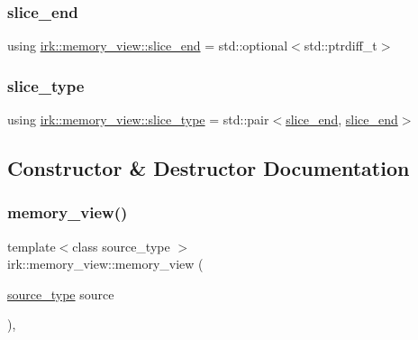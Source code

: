 \mbox{\label{classirk_1_1memory__view_afbb67d0d922dfae3ea53d41706bd8eea}} 
\subsubsection{\texorpdfstring{slice\+\_\+end}{slice\_end}}
{\footnotesize\ttfamily using \mbox{\hyperlink{classirk_1_1memory__view_afbb67d0d922dfae3ea53d41706bd8eea}{irk\+::memory\+\_\+view\+::slice\+\_\+end}} =  std\+::optional$<$std\+::ptrdiff\+\_\+t$>$}

\mbox{\label{classirk_1_1memory__view_ac0c1d9600bf81e8cb861a89ab104a43c}} 
\subsubsection{\texorpdfstring{slice\+\_\+type}{slice\_type}}
{\footnotesize\ttfamily using \mbox{\hyperlink{classirk_1_1memory__view_ac0c1d9600bf81e8cb861a89ab104a43c}{irk\+::memory\+\_\+view\+::slice\+\_\+type}} =  std\+::pair$<$\mbox{\hyperlink{classirk_1_1memory__view_afbb67d0d922dfae3ea53d41706bd8eea}{slice\+\_\+end}}, \mbox{\hyperlink{classirk_1_1memory__view_afbb67d0d922dfae3ea53d41706bd8eea}{slice\+\_\+end}}$>$}



\subsection{Constructor \& Destructor Documentation}
\mbox{\label{classirk_1_1memory__view_a25918933f1b7944199c65654517d2a72}} 
\subsubsection{\texorpdfstring{memory\+\_\+view()}{memory\_view()}\hspace{0.1cm}{\footnotesize\ttfamily [1/4]}}
{\footnotesize\ttfamily template$<$class source\+\_\+type $>$ \\
irk\+::memory\+\_\+view\+::memory\+\_\+view (\begin{DoxyParamCaption}\item[{\mbox{\hyperlink{irk-score_8cpp_a73f57f67fb1e33bdbfd80bfba2fc9ffe}{source\+\_\+type}}}]{source }\end{DoxyParamCaption})\hspace{0.3cm}{\ttfamily [inline]}, {\ttfamily [explicit]}}




